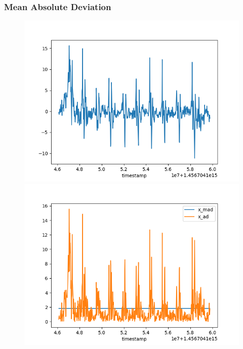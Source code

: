 \documentclass{beamer}
\begin{document}
\begin{frame}
\frametitle{Mean Absolute Deviation}
\begin{figure}
	\includegraphics[scale=.35]{vanilla_gyro}
	\includegraphics[scale=.35]{mad_ad}
\end{figure}
\end{frame}
\end{document}
